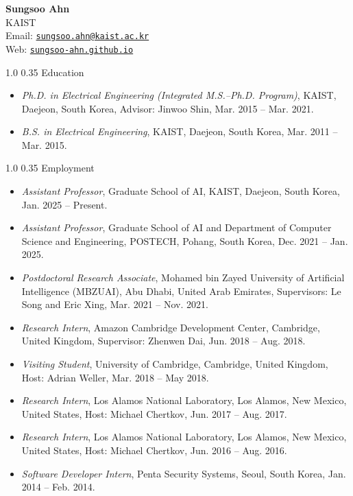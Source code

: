 \documentclass[11pt]{article}
\makeatletter
\newcommand{\cvunnumberedentry}[3]{%
  \item[] \textit{#1}, #2, #3.%
}
\renewcommand{\section}{\@startsection{section}{1}{0pt}%
  {1.0\baselineskip}%
  {0.35\baselineskip}%
  {\Large\bfseries}}
\makeatother
\begin{document}
\thispagestyle{empty}


\begin{center}
    {\Huge \bf Sungsoo Ahn} \vspace{.2in} \\
    KAIST\\
    {Email:} \href{mailto:sungsoo.ahn@kaist.ac.kr}{\texttt{sungsoo.ahn@kaist.ac.kr}} \\
    {Web:} \href{https://sungsoo-ahn.github.io}{\texttt{sungsoo-ahn.github.io}}
\end{center}
\section{Education}
\begin{itemize}
\cvunnumberedentry{Ph.D. in Electrical Engineering (Integrated M.S.--Ph.D. Program)}{KAIST, Daejeon, South Korea, Advisor: Jinwoo Shin}{Mar. 2015 -- Mar. 2021}
\cvunnumberedentry{B.S. in Electrical Engineering}{KAIST, Daejeon, South Korea}{Mar. 2011 -- Mar. 2015}
\end{itemize}
\section{Employment}
\begin{itemize}
\cvunnumberedentry{Assistant Professor}{Graduate School of AI, KAIST, Daejeon, South Korea}{Jan. 2025 -- Present}
\cvunnumberedentry{Assistant Professor}{Graduate School of AI and Department of Computer Science and Engineering, POSTECH, Pohang, South Korea}{Dec. 2021 -- Jan. 2025}
\cvunnumberedentry{Postdoctoral Research Associate}{Mohamed bin Zayed University of Artificial Intelligence (MBZUAI), Abu Dhabi, United Arab Emirates, Supervisors: Le Song and Eric Xing}{Mar. 2021 -- Nov. 2021}
\cvunnumberedentry{Research Intern}{Amazon Cambridge Development Center, Cambridge, United Kingdom, Supervisor: Zhenwen Dai}{Jun. 2018 -- Aug. 2018}
\cvunnumberedentry{Visiting Student}{University of Cambridge, Cambridge, United Kingdom, Host: Adrian Weller}{Mar. 2018 -- May 2018}
\cvunnumberedentry{Research Intern}{Los Alamos National Laboratory, Los Alamos, New Mexico, United States, Host: Michael Chertkov}{Jun. 2017 -- Aug. 2017}
\cvunnumberedentry{Research Intern}{Los Alamos National Laboratory, Los Alamos, New Mexico, United States, Host: Michael Chertkov}{Jun. 2016 -- Aug. 2016}
\cvunnumberedentry{Software Developer Intern}{Penta Security Systems, Seoul, South Korea}{Jan. 2014 -- Feb. 2014}
\end{itemize}
\end{document}

